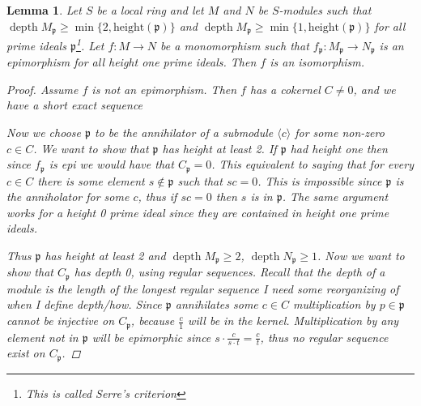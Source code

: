 \documentclass[11pt, a4paper, english]{article}
\numberwithin{prop}{section}
\newtheorem{lemma}{Lemma}
\numberwithin{lemma}{section}
\numberwithin{theorem}{section}
\numberwithin{defin}{section}
\numberwithin{example}{section}
\DeclareMathOperator{\depth}{depth}
\begin{document}
\begin{lemma}
\label{lem:height_one_iso}
Let $S$ be a local ring and let $M$ and $N$ be $S$-modules such that $\depth M_\mathfrak{p} \geq \min \{ 2, \text{height}(\mathfrak{p}) \}$ and $\depth M_\mathfrak{p} \geq \min \{ 1, \text{height}(\mathfrak{p}) \}$ for all prime ideals $\mathfrak{p}$\footnote{This is called Serre's criterion}. Let $f: M \to N$ be a monomorphism such that $f_\mathfrak{p}: M_\mathfrak{p} \to N_\mathfrak{p}$ is an epimorphism for all height one prime ideals. Then $f$ is an isomorphism.
\begin{proof}
Assume $f$ is not an epimorphism. Then $f$ has a cokernel $C \neq 0$, and we have a short exact sequence
\begin{center}
\end{center}
Now we choose $\mathfrak{p}$ to be the annihilator of a submodule $\langle c \rangle$ for some non-zero $c \in C$. We want to show that $\mathfrak{p}$ has height at least 2. If $\mathfrak{p}$ had height one then since $f_\mathfrak{p}$ is epi we would have that $C_\mathfrak{p} = 0$. This equivalent to saying that for every $c \in C$ there is some element $s \not\in \mathfrak{p}$ such that $sc = 0$. This is impossible since $\mathfrak{p}$ is the anniholator for some $c$, thus if $sc=0$ then $s$ is in $\mathfrak{p}$. The same argument works for a height 0 prime ideal since they are contained in height one prime ideals.

Thus $\mathfrak{p}$ has height at least 2 and $\depth M_\mathfrak{p} \geq 2$, $\depth N_\mathfrak{p} \geq 1$. Now we want to show that $C_\mathfrak{p}$ has depth 0, using regular sequences. Recall that the depth of a module is the length of the longest regular sequence {\color{red} I need some reorganizing of when I define depth/how}. Since $\mathfrak{p}$ annihilates some $c \in C$ multiplication by $p \in \mathfrak{p}$ cannot be injective on $C_\mathfrak{p}$, because $\frac{c}{1}$ will be in the kernel. Multiplication by any element not in $\mathfrak{p}$ will be epimorphic since $s \cdot \frac{c}{s \cdot t} = \frac{c}{t}$, thus no regular sequence exist on $C_\mathfrak{p}$.


\end{proof}
\end{lemma}
\end{document}
